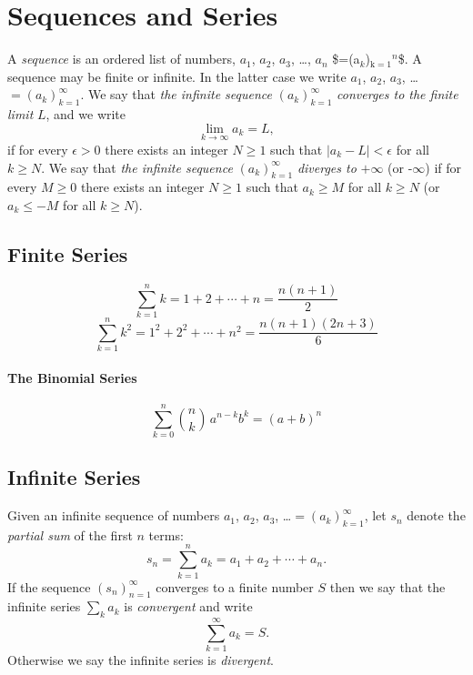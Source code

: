 \documentclass[captions=tableheading]{scrbook}
\begin{document}
\section{Sequences and Series \label{sec:Sequences-and-Series}}
\label{sec-6-3}


A \emph{sequence} is an ordered list of numbers, $a_{1}$, $a_{2}$, $a_{3}$, \ldots{}, $a_{n}$ \$=\left(a$_{k}$\right)$_{\mathrm{k=1}}$$^{n}$\$. A sequence may be finite or infinite. In the latter case we write $a_{1}$, $a_{2}$, $a_{3}$, \ldots{}$=\left(a_{k}\right)_{k=1}^{\infty}$. We say that \emph{the infinite sequence} $\left(a_{k}\right)_{k=1}^{\infty}$ \emph{converges to the finite limit} $L$, and we write
\begin{equation}
\lim_{k\to\infty}a_{k} = L,
\end{equation}
if for every $\epsilon > 0$ there exists an integer $N \geq 1$ such that $|a_{k} - L| < \epsilon$ for all $k \geq N$. We say that \emph{the infinite sequence} $\left(a_{k}\right)_{k=1}^{\infty}$ \emph{diverges to} $+\infty$ (or -$\infty$) if for every $M\geq0$ there exists an integer $N\geq1$ such that $a_{k} \geq M$ for all $k \geq N$ (or $a_{k} \leq - M$ for all $k \geq N$).
\subsection{Finite Series}
\label{sec-6-3-1}


\begin{equation}
\sum_{k=1}^{n}k=1+2+\cdots+n=\frac{n(n+1)}{2}\label{eq:gauss-series}
\end{equation}
\begin{equation}
\sum_{k=1}^{n}k^{2}=1^{2}+2^{2}+\cdots+n^{2}=\frac{n(n+1)(2n+3)}{6}\label{eq:gauss-series-sq}
\end{equation}


\paragraph*{The Binomial Series}
\begin{equation}
\sum_{k=0}^{n}{n \choose k}\, a^{n-k}b^{k}=(a+b)^{n}\label{eq:binom-series}
\end{equation}
\subsection{Infinite Series}
\label{sec-6-3-2}


Given an infinite sequence of numbers $a_{1}$, $a_{2}$, $a_{3}$, \ldots{}$=\left(a_{k}\right)_{k=1}^{\infty}$, let $s_{n}$ denote the \emph{partial sum} of the first $n$ terms:
\begin{equation}
s_{n}=\sum_{k=1}^{n}a_{k}=a_{1}+a_{2}+\cdots+a_{n}.
\end{equation}
If the sequence $\left(s_{n}\right)_{n=1}^{\infty}$ converges to a finite number $S$ then we say that the infinite series $\sum_{k}a_{k}$ is \emph{convergent} and write
\begin{equation}
\sum_{k=1}^{\infty}a_{k}=S.
\end{equation}
Otherwise we say the infinite series is \emph{divergent}.
\end{document}
